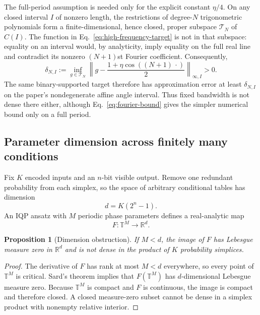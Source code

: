 \documentclass[11pt]{article}
\newtheorem{proposition}[theorem]{Proposition}
\theoremstyle{definition}
\theoremstyle{remark}
\newcommand{\R}{\mathbb{R}}
\begin{document}
The full-period assumption is needed only for the explicit constant
$\eta/4$.  On any closed interval $I$ of nonzero length, the restrictions of
degree-$N$ trigonometric polynomials form a finite-dimensional, hence closed,
proper subspace $\mathcal{T}_N$ of $C(I)$.  The function in
Eq.~\eqref{eq:high-frequency-target} is not in that subspace: equality on an
interval would, by analyticity, imply equality on the full real line and
contradict its nonzero $(N+1)$st Fourier coefficient.  Consequently,
\begin{equation}
 \delta_{N,I}:=\inf_{g\in\mathcal{T}_N}
 \left\|g-\frac{1+\eta\cos((N+1)\,\cdot)}{2}\right\|_{\infty,I}>0.
 \label{eq:interval-fourier-gap}
\end{equation}
The same binary-supported target therefore has approximation error at least
$\delta_{N,I}$ on the paper's nondegenerate affine angle interval.  Thus
fixed bandwidth is not dense there either, although
Eq.~\eqref{eq:fourier-bound} gives the simpler numerical bound only on a full
period.

\subsection{Parameter dimension across finitely many conditions}

Fix $K$ encoded inputs and an $n$-bit visible output.  Remove one redundant
probability from each simplex, so the space of arbitrary conditional tables
has dimension
\begin{equation}
 d=K(2^n-1).
 \label{eq:table-dimension}
\end{equation}
An IQP ansatz with $M$ periodic phase parameters defines a real-analytic map
\begin{equation}
 F:\mathbb{T}^M\longrightarrow\R^d.
 \label{eq:analytic-map}
\end{equation}

\begin{proposition}[Dimension obstruction]
\label{prop:dimension}
If $M<d$, the image of $F$ has Lebesgue measure zero in $\R^d$ and is not
dense in the product of $K$ probability simplices.
\end{proposition}

\begin{proof}
The derivative of $F$ has rank at most $M<d$ everywhere, so every point of
$\mathbb{T}^M$ is critical.  Sard's theorem implies that $F(\mathbb{T}^M)$
has $d$-dimensional Lebesgue measure zero.  Because $\mathbb{T}^M$ is compact
and $F$ is continuous, the image is compact and therefore closed.  A closed
measure-zero subset cannot be dense in a simplex product with nonempty
relative interior.
\end{proof}
\end{document}
